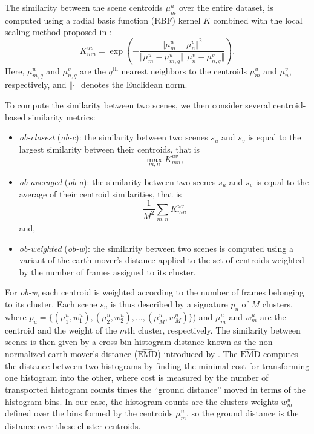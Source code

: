 \documentclass[journal]{IEEEtran}
\newcommand*{\EMD}{\mathrm{EMD}}
\begin{document}
The similarity between the scene centroids $\mu_m^u$ over the entire dataset, is computed using a radial basis function (RBF) kernel $K$ combined with the local scaling method proposed in \cite{selfTuneManor2004}:
\begin{equation}
\label{eq:kc}
K_{mn}^{uv} = \exp\left( - \dfrac{\Vert \mu_m^u - \mu_n^v \Vert^2}{\Vert \mu_m^u - \mu_{m,q}^u \Vert \Vert \mu_n^v - \mu_{n,q}^v \Vert} \right).
\end{equation} 
Here, $\mu_{m,q}^u$ and $\mu_{n,q}^v$ are the $q^{\textrm{th}}$ nearest neighbors to the centroids $\mu_m^u$ and $\mu_n^v$, respectively, and $\Vert \cdot \Vert$ denotes the Euclidean norm.

To compute the similarity between two scenes, we then consider several centroid-based similarity metrics:
\begin{itemize}
\item \emph{ob-closest} (\emph{ob-c}): the similarity between two scenes $s_u$ and $s_v$ is equal to the largest similarity between their centroids, that is
\begin{equation}
	\max_{m,n} K_{mn}^{uv},
\end{equation}
\item \emph{ob-averaged} (\emph{ob-a}): the similarity between two scenes $s_u$ and $s_v$ is equal to the average of their centroid similarities, that is
\begin{equation}
	\frac{1}{M^2} \sum_{m,n} K_{mn}^{uv}
\end{equation}
and,
\item \emph{ob-weighted} (\emph{ob-w}): the similarity between two scenes is computed using a variant of the earth mover's distance applied to the set of centroids weighted by the number of frames assigned to its cluster.
\end{itemize}

For \emph{ob-w}, each centroid is weighted according to the number of frames belonging to its cluster. Each scene $s_u$ is thus described by a signature $p_u$ of $M$ clusters, where $p_u=\lbrace(\mu_1^u,w_1^u),(\mu_2^u,w_2^u),\ldots,(\mu_M^u,w_M^u)\rbrace$) and $\mu_m^u$ and $w_m^u$ are the centroid and the weight of the $m$th cluster, respectively. The similarity between scenes is then given by a cross-bin histogram distance known as the non-normalized earth mover's distance ($\widehat{\EMD}$) introduced by \cite{pele2008linear}. The $\widehat{\EMD}$ computes the distance between two histograms by finding the minimal cost for transforming one histogram into the other, where cost is measured by the number of transported histogram counts times the ``ground distance'' moved in terms of the histogram bins. In our case, the histogram counts are the clusters weights $w_m^u$ defined over the bins formed by the centroids $\mu_m^u$, so the ground distance is the distance over these cluster centroids.
\end{document}
